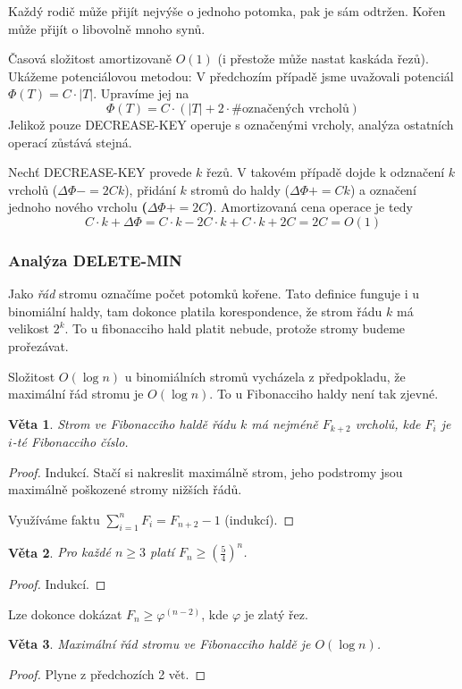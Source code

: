 \documentclass[11pt]{report} %
\newtheorem{theorem}{Věta}[section]
\numberwithin{equation}{section}
\begin{document}
Každý rodič může přijít nejvýše o jednoho potomka, pak je sám odtržen. Kořen může přijít o libovolně mnoho synů.

Časová složitost amortizovaně $O(1)$ (i přestože může nastat kaskáda řezů). Ukážeme potenciálovou metodou: V předchozím případě jsme uvažovali potenciál $\Phi(T) = C \cdot |T|$. Upravíme jej na 
$$\Phi(T) = C \cdot(|T| + 2\cdot \#\text{označených vrcholů})$$
Jelikož pouze DECREASE-KEY operuje s označenými vrcholy, analýza ostatních operací zůstává stejná.

Nechť DECREASE-KEY provede $k$ řezů. V takovém případě dojde k odznačení $k$ vrcholů ($\Delta\Phi -= 2Ck$), přidání $k$ stromů do haldy ($\Delta\Phi += Ck$) a označení jednoho nového vrcholu \textbf{($\Delta\Phi += 2C$)}. Amortizovaná cena operace je tedy
$$C\cdot k + \Delta\Phi = C\cdot k - 2C\cdot k + C\cdot k + 2C = 2C = O(1)$$


\subsubsection{Analýza DELETE-MIN}
Jako \textit{řád} stromu označíme počet potomků kořene. Tato definice funguje i u binomiální haldy, tam dokonce platila korespondence, že strom řádu $k$ má velikost $2^k$. To u fibonacciho hald platit nebude, protože stromy budeme prořezávat.

Složitost $O(\log n)$ u binomiálních stromů vycházela z předpokladu, že maximální řád stromu je $O(\log n)$. To u Fibonacciho haldy není tak zjevné.

\begin{theorem}
Strom ve Fibonacciho haldě řádu $k$ má nejméně $F_{k+2}$ vrcholů, kde $F_i$ je $i$-té Fibonacciho číslo.
\end{theorem}
\begin{proof}
Indukcí. Stačí si nakreslit maximálně  strom, jeho podstromy jsou maximálně poškozené stromy nižších řádů.

Využíváme faktu $\sum\limits_{i = 1}^{n} F_i = F_{n+2} - 1$ (indukcí).
\end{proof}

\begin{theorem}
Pro každé $n \geq 3$ platí $F_n \geq (\frac{5}{4})^n$. 
\end{theorem}
\begin{proof}
Indukcí.
\end{proof}
Lze dokonce dokázat $F_n \geq \varphi^{(n-2)}$, kde $\varphi$ je zlatý řez.

\begin{theorem}
Maximální řád stromu ve Fibonacciho haldě je $O(\log n)$.
\end{theorem}
\begin{proof}
Plyne z předchozích 2 vět.
\end{proof}
\end{document}
